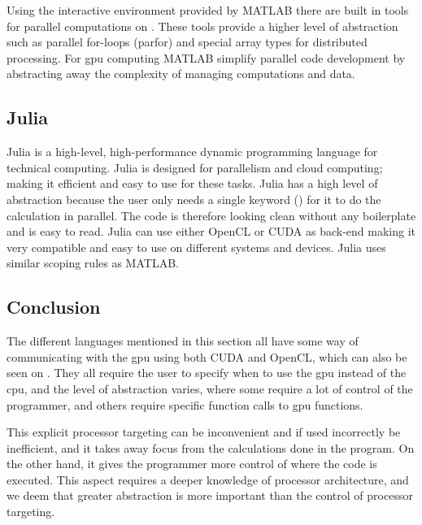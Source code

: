 Using the interactive environment provided by MATLAB there are built in tools for parallel computations on .
These tools provide a higher level of abstraction such as parallel for-loops (parfor) and special array types for distributed processing.
For \acrshort{gpu} computing MATLAB simplify parallel code development by abstracting away the complexity of managing computations and data. \citep{MATLAB_parallel}

\subsection{Julia}
Julia is a high-level, high-performance dynamic programming language for technical computing.
Julia is designed for parallelism and cloud computing; making it efficient and easy to use for these tasks.
Julia has a high level of abstraction because the user only needs a single keyword (\@parallel) for it to do the calculation in parallel.
The code is therefore looking clean without any boilerplate and is easy to read.
Julia can use either OpenCL or CUDA as back-end making it very compatible and easy to use on different systems and devices.
Julia uses similar scoping rules as MATLAB. \citep{Julia_Git, Julia_scope,Julia}

 

\subsection{Conclusion}  

The different languages mentioned in this section all have some way of communicating with the \acrshort{gpu} using both CUDA and OpenCL, which can also be seen on .
They all require the user to specify when to use the \acrshort{gpu} instead of the \acrshort{cpu}, and the level of abstraction varies, where some require a lot of control of the programmer, and others require specific function calls to \acrshort{gpu} functions.

This explicit processor targeting can be inconvenient and if used incorrectly be inefficient, and it takes away focus from the calculations done in the program.
On the other hand, it gives the programmer more control of where the code is executed.
This aspect requires a deeper knowledge of processor architecture, and we deem that greater abstraction is more important than the control of processor targeting.

